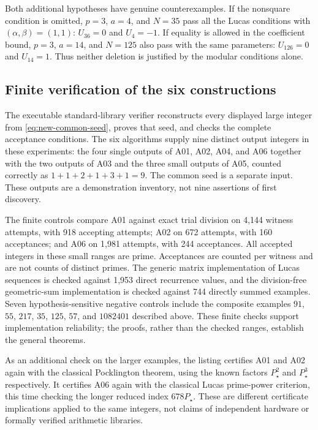 \documentclass[11pt,a4paper]{article}
\theoremstyle{definition}\newtheorem{definition}[theorem]{Definition}
\theoremstyle{remark}\newtheorem{remark}[theorem]{Remark}
\begin{document}
Both additional hypotheses have genuine counterexamples. If the nonsquare
condition is omitted, $p=3$, $a=4$, and $N=35$ pass all the Lucas conditions
with $(\alpha,\beta)=(1,1)$: $U_{36}=0$ and $U_4=-1$.
If equality is allowed in the coefficient bound, $p=3$, $a=14$, and
$N=125$ also pass with the same parameters: $U_{126}=0$ and $U_{14}=1$.
Thus neither deletion is justified by the modular conditions alone.

\subsection{Finite verification of the six constructions}
\label{sec:construction-verification}

The executable standard-library verifier reconstructs every displayed large
integer from \eqref{eq:new-common-seed}, proves that seed, and checks the
complete acceptance conditions. The six algorithms supply nine distinct
output integers in these experiments: the four single outputs of A01, A02,
A04, and A06 together with the two outputs of A03 and the three small outputs
of A05, counted correctly as $1+1+2+1+3+1=9$.
The common seed is a separate input. These outputs are a demonstration
inventory, not nine assertions of first discovery.

The finite controls compare A01 against exact trial division on 4,144
witness attempts, with 918 accepting attempts; A02 on 672 attempts, with
160 acceptances; and A06 on 1,981 attempts, with 244 acceptances.
All accepted integers in these small ranges are prime. Acceptances are
counted per witness and are not counts of distinct primes.
The generic matrix implementation of Lucas sequences is checked against
1,953 direct recurrence values, and the division-free geometric-sum
implementation is checked against 744 directly summed examples.
Seven hypothesis-sensitive negative controls include the composite examples
$91$, $55$, $217$, $35$, $125$, $57$, and $1082401$ described above.
These finite checks support implementation reliability; the proofs, rather
than the checked ranges, establish the general theorems.

As an additional check on the larger examples, the listing certifies A01
and A02 again with the classical Pocklington theorem, using the known
factors $P_\star^2$ and $P_\star^3$ respectively. It certifies A06 again
with the classical Lucas prime-power criterion, this time checking the
longer reduced index $678P_\star$. These are different certificate
implications applied to the same integers, not claims of independent
hardware or formally verified arithmetic libraries.
\end{document}
